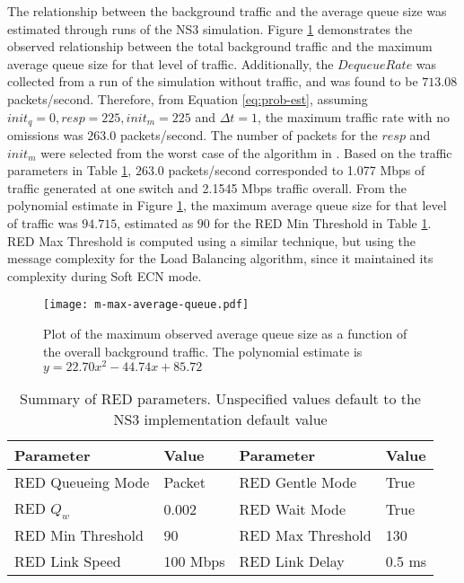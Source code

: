 The relationship between the background traffic and the average queue size was estimated through runs of the \ac{NS3} simulation.
Figure \ref{fig:plotm} demonstrates the observed relationship between the total background traffic and the maximum average queue size for that level of traffic.
Additionally, the $DequeueRate$ was collected from a run of the simulation without traffic, and was found to be $713.08$ packets/second.
Therefore, from Equation \ref{eq:prob-est}, assuming $init_q=0, resp=225, init_m=225$ and $\Delta t=1$, the maximum traffic rate with no omissions was $263.0$ packets/second.
The number of packets for the $resp$ and $init_m$ were selected from the worst case of the algorithm in \cite{JOURNAL}.
Based on the traffic parameters in Table \ref{tab:red-parameters}, $263.0$ packets/second corresponded to 1.077 Mbps of traffic generated at one switch and 2.1545 Mbps traffic overall.
From the polynomial estimate in Figure \ref{fig:plotm}, the maximum average queue size for that level of traffic was $94.715$, estimated as $90$ for the \ac{RED} Min Threshold in Table \ref{tab:red-parameters}.
RED Max Threshold is computed using a similar technique, but using the message complexity for the Load Balancing algorithm, since it maintained its complexity during Soft ECN mode.

\begin{figure}
\centering
\texttt{[image: m-max-average-queue.pdf]}
\caption[Plot of the maximum observed average queue size as a function of the overall background traffic.]{Plot of the maximum observed average queue size as a function of the overall background traffic. The polynomial estimate is $y=22.70x^2-44.74x+85.72$}
\label{fig:plotm}
\end{figure}

\begin{table}
\begin{center}
\begin{tabular}{ | l | l || l | l | } \hline
Parameter & Value & Parameter & Value        \\ \hline
RED Queueing Mode & Packet & RED Gentle Mode & True    \\ \hline
RED $Q_{w}$ & 0.002 & RED Wait Mode & True      \\ \hline
RED Min Threshold & 90 & RED Max Threshold & 130   \\ \hline
RED Link Speed & 100 Mbps & RED Link Delay & 0.5 ms   \\ \hline
\end{tabular}
\end{center}
\caption{Summary of \ac{RED} parameters. Unspecified values default to the \ac{NS3} implementation default value}
\label{tab:red-parameters}
\end{table}

